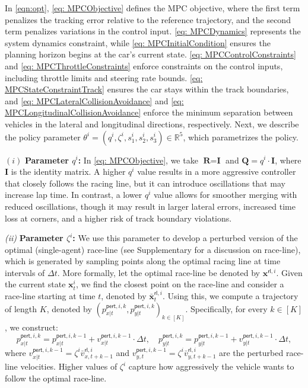 In \eqref{eqn:opt}, \eqref{eq: MPCObjective} defines the MPC objective, where the first term penalizes the tracking error relative to the reference trajectory, and the second term penalizes variations in the control input. \eqref{eq: MPCDynamics} represents the system dynamics constraint, while \eqref{eq: MPCInitialCondition} ensures the planning horizon begins at the car's current state. \eqref{eq: MPCControlConstraints} and \eqref{eq: MPCThrottleConstraints} enforce constraints on the control inputs, including throttle limits and steering rate bounds. \eqref{eq: MPCStateConstraintTrack} ensures the car stays within the track boundaries, and \eqref{eq: MPCLateralCollisionAvoidance} and \eqref{eq: MPCLongitudinalCollisionAvoidance} enforce the minimum separation between vehicles in the lateral and longitudinal directions, respectively. Next, we describe the policy parameter \(\theta^i = (q^i, \zeta^i, s_1^i, s_2^i, s_3^i) \in \mathbb{R}^5\), which parametrizes the policy.


\((i)\) \textbf{Parameter \(q^i\):} In \eqref{eq: MPCObjective}, we take $\textbf{R}=\textbf{I}$ and $\textbf{Q}=q^i\cdot \textbf{I}$, where \(\mathbf{I}\) is the identity matrix. A higher \(q^i\) value results in a more aggressive controller that closely follows the racing line, but it can introduce oscillations that may increase lap time. In contrast, a lower \(q^i\) value allows for smoother merging with reduced oscillations, though it may result in larger lateral errors, increased time loss at corners, and a higher risk of track boundary violations.

\textit{(ii)} \textbf{Parameter \(\zeta^i\):} We use this parameter to develop a perturbed version of the optimal (single-agent) race-line (see Supplementary for a discussion on race-line), which is generated by sampling points along the optimal racing line at time intervals of \(\Delta t\). More formally, let the optimal race-line be denoted by \(\mathbf{x}^{\textsf{rl},i}\). Given the current state \(\mathbf{x}_t^i\), we find the closest point on the race-line and consider a race-line starting at time \(t\), denoted by \(\bar{\mathbf{x}}_t^{\textsf{rl},i}\). Using this, we compute a trajectory of length \(K\), denoted by \((p_{x|t}^{\textsf{pert},i,k}, p_{y|t}^{\textsf{pert},i,k})_{k \in [K]}\). Specifically, for every \(k \in [K]\), we construct:
\[
p_{x|t}^{\textsf{pert},i,k} = p_{x|t}^{\textsf{pert},i,k-1} + v_{x|t}^{\textsf{pert},i,k-1} \cdot \Delta t, \quad p_{y|t}^{\textsf{pert},i,k} = p_{y|t}^{\textsf{pert},i,k-1} + v_{y|t}^{\textsf{pert},i,k-1} \cdot \Delta t,
\]
where \(v_{x|t}^{\textsf{pert},i,k-1} = \zeta^i \bar{v}_{x,t+k-1}^{\textsf{rl},i}\) and \(v_{y,t}^{\textsf{pert},i,k-1} = \zeta^i \bar{v}_{y,t+k-1}^{\textsf{rl},i}\) are the perturbed race-line velocities. Higher values of \(\zeta^i\) capture how aggressively the vehicle wants to follow the optimal race-line.


